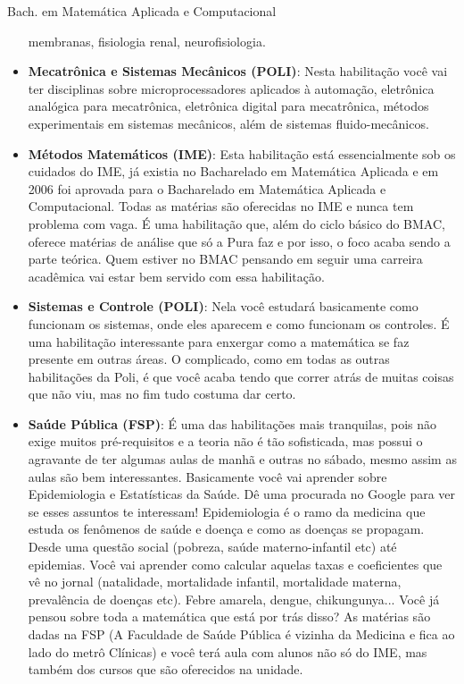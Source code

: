 \begin{subsecao}{Bach. em Matemática Aplicada e Computacional}
\begin{itemize}
    membranas, fisiologia renal, neurofisiologia.
  \item \textbf{Mecatrônica e Sistemas Mecânicos (POLI)}: Nesta habilitação você
    vai ter disciplinas sobre microprocessadores aplicados à automação,
    eletrônica analógica para mecatrônica, eletrônica digital para mecatrônica,
    métodos experimentais em sistemas mecânicos, além de sistemas
    fluido-mecânicos.
  \item \textbf{Métodos Matemáticos (IME)}: Esta habilitação está essencialmente
    sob os cuidados do IME, já existia no Bacharelado em Matemática Aplicada e
    em 2006 foi aprovada para o Bacharelado em Matemática Aplicada e
    Computacional. Todas as matérias são oferecidas no IME e nunca tem problema
    com vaga. É uma habilitação que, além do ciclo básico do BMAC, oferece
    matérias de análise que só a Pura faz e por isso, o foco acaba sendo a parte
    teórica. Quem estiver no BMAC pensando em seguir uma carreira acadêmica vai
    estar bem servido com essa habilitação.
  \item \textbf{Sistemas e Controle (POLI)}: Nela você estudará basicamente como
    funcionam os sistemas, onde eles aparecem e como funcionam os controles.
    É uma habilitação interessante para enxergar como a matemática se faz presente 
    em outras áreas. O complicado, como em todas as outras habilitações da Poli, é 
    que você acaba tendo que correr atrás de muitas coisas que não viu, mas no
    fim tudo costuma dar certo.
  \item \textbf{Saúde Pública (FSP)}: É uma das habilitações mais
    tranquilas, pois não exige muitos pré-requisitos e a teoria não é tão
    sofisticada, mas possui o agravante de ter algumas aulas de manhã e outras
    no sábado, mesmo assim as aulas são bem interessantes. Basicamente você vai
    aprender sobre Epidemiologia e Estatísticas da Saúde. Dê uma procurada no
    Google para ver se esses assuntos te interessam! Epidemiologia é o ramo da
    medicina que estuda os fenômenos de saúde e doença e como as doenças se
    propagam. Desde uma questão social (pobreza, saúde materno-infantil etc)
    até epidemias. Você vai aprender como calcular aquelas taxas e coeficientes
    que vê no jornal (natalidade, mortalidade infantil, mortalidade materna,
    prevalência de doenças etc). Febre amarela, dengue, chikungunya... Você já
    pensou sobre toda a matemática que está por trás disso? As matérias são dadas na
    FSP (A Faculdade de Saúde Pública é vizinha da Medicina e fica ao lado do
    metrô Clínicas) e você terá aula com alunos não só do IME, mas também dos
    cursos que são oferecidos na unidade.
\end{itemize}


\end{subsecao}
